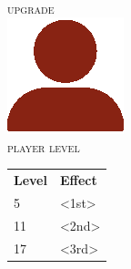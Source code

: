 \vspace{-4mm}
\centering{\rule{\textwidth}{0.7pt}}\\

\begin{minipage}[t]{\textwidth}
	\scriptsize
	\begin{minipage}[c]{0.2\textwidth}
		\vspace{1mm}
		\centering
		\textsc{upgrade}\\
		\includegraphics[scale=0.2]{./images/requirements/upgrade-player.png}\\
		\tiny\textsc{player level}
	\end{minipage}
	\hfill
	\setlength{\tabcolsep}{0.5em}
	\begin{tabularx}{0.75\textwidth}{lX}
		\textbf{Level}	& \textbf{Effect}\\
		\rowcolor{dnd-lightgreen}
		5				& <1st>\\
		11				& <2nd>\\
		\rowcolor{dnd-lightgreen}
		17				& <3rd>
	\end{tabularx}
\end{minipage}
